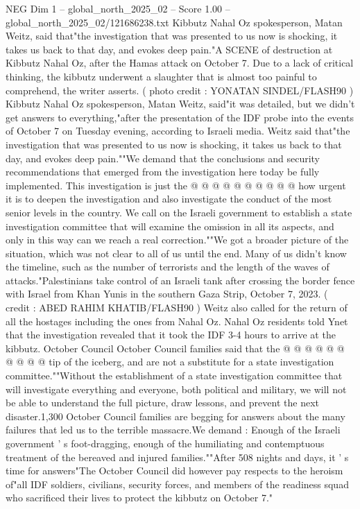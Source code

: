 \begin{textsample}{NEG Dim 1 – global\_north\_2025\_02 – Score 1.00 – global\_north\_2025\_02/121686238.txt}  \label{ex:f1_neg_019}
Kibbutz Nahal Oz spokesperson, Matan Weitz, said that"the investigation that was presented to us now is shocking, it takes us back to that day, and evokes deep pain."A SCENE of destruction at Kibbutz Nahal Oz, after the Hamas attack on October 7.
Due to a lack of critical thinking, the kibbutz underwent a slaughter that is almost too painful to comprehend, the writer asserts. ( photo credit : YONATAN SINDEL/FLASH90 ) Kibbutz Nahal Oz spokesperson, Matan Weitz, said"it was detailed, but we didn't get answers to everything,"after the presentation of the IDF probe into the events of October 7 on Tuesday evening, according to Israeli media.
Weitz said that"the investigation that was presented to us now is shocking, it takes us back to that day, and evokes deep pain.""We demand that the conclusions and security recommendations that emerged from the investigation here today be fully implemented.
This investigation is just the @ @ @ @ @ @ @ @ @ @ how urgent it is to deepen the investigation and also investigate the conduct of the most senior levels in the country.
We call on the Israeli government to establish a state investigation committee that will examine the omission in all its aspects, and only in this way can we reach a real correction.""We got a broader picture of the situation, which was not clear to all of us until the end.
Many of us didn't know the timeline, such as the number of terrorists and the length of the waves of attacks."Palestinians take control of an Israeli tank after crossing the border fence with Israel from Khan Yunis in the southern Gaza Strip, October 7, 2023. ( credit : ABED RAHIM KHATIB/FLASH90 ) Weitz also called for the return of all the hostages including the ones from Nahal Oz.
Nahal Oz residents told Ynet that the investigation revealed that it took the IDF 3-4 hours to arrive at the kibbutz.
October Council October Council families said that the @ @ @ @ @ @ @ @ @ @ tip of the iceberg, and are not a substitute for a state investigation committee.""Without the establishment of a state investigation committee that will investigate everything and everyone, both political and military, we will not be able to understand the full picture, draw lessons, and prevent the next disaster.1,300 October Council families are begging for answers about the many failures that led us to the terrible massacre.We demand : Enough of the Israeli government ' s foot-dragging, enough of the humiliating and contemptuous treatment of the bereaved and injured families.""After 508 nights and days, it ' s time for answers"The October Council did however pay respects to the heroism of"all IDF soldiers, civilians, security forces, and members of the readiness squad who sacrificed their lives to protect the kibbutz on October 7."

\end{textsample}
